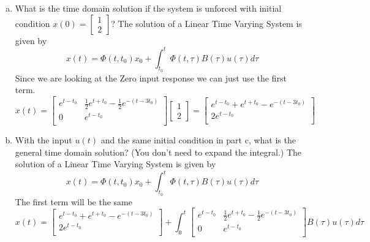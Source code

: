 \documentclass{article}
\begin{document}
\begin{enumerate}[a.]
\item What is the time domain solution if the system is unforced with initial condition $x(0) = \begin{bmatrix}1 \\ 2 \end{bmatrix}$?
\newline
The solution of a Linear Time Varying System is given by
$$x(t) = \Phi(t,t_0)x_0 + \int_{t_0}^{t}\Phi(t,\tau)B(\tau)u(\tau)d\tau $$
Since we are looking at the Zero input response we can just use the first term.
$$x(t) =
\begin{bmatrix}
e^{t - t_0} & \frac{1}{2}e^{t+t_0}-\frac{1}{2} e^{-(t - 3 t_0)} \\
0 & e^{t-t_0} \\
\end{bmatrix}
\begin{bmatrix}
1 \\
2
\end{bmatrix}
=
\begin{bmatrix}
e^{t - t_0} + e^{t+t_0} - e^{-(t - 3 t_0)} \\
2 e^{t-t_0} \\
\end{bmatrix}
$$

\item With the input $u(t)$ and the same initial condition in part c, what is the general time domain solution? (You don't need to expand the integral.)
\newline
The solution of a Linear Time Varying System is given by
$$x(t) = \Phi(t,t_0)x_0 + \int_{t_0}^{t}\Phi(t,\tau)B(\tau)u(\tau)d\tau $$
The first term will be the same
$$x(t) =
\begin{bmatrix}
e^{t - t_0} + e^{t+t_0} - e^{-(t - 3 t_0)} \\
2 e^{t-t_0} \\
\end{bmatrix}
+
\int_{0}^{t}
\begin{bmatrix}
e^{t - t_0} & \frac{1}{2}e^{t+t_0}-\frac{1}{2} e^{-(t - 3 t_0)} \\
0 & e^{t-t_0} \\
\end{bmatrix}
B(\tau)
u(\tau)
d\tau
$$


\end{enumerate}

\newpage
\end{document}
